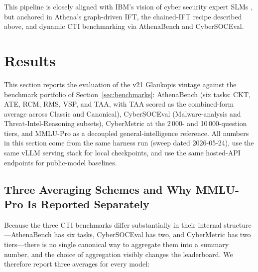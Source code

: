 \documentclass[webpdf,contemporary,large]{oup-authoring-template}
\theoremstyle{thmstyleone}
\theoremstyle{thmstyletwo}
\theoremstyle{thmstylethree}
\begin{document}
This pipeline is closely aligned with IBM's vision of cyber security expert SLMs \cite{levi2024cyberpal,levi2025toward}, but anchored in Athena's graph-driven IFT, the chained-IFT recipe described above, and dynamic CTI benchmarking via AthenaBench and CyberSOCEval.


\section{Results}
\label{sec:results}

This section reports the evaluation of the v21 Glaukopis vintage against the benchmark portfolio of Section~\ref{sec:benchmarks}: AthenaBench (six tasks: CKT, ATE, RCM, RMS, VSP, and TAA, with TAA scored as the combined-form average across Classic and Canonical), CyberSOCEval (Malware-analysis and Threat-Intel-Reasoning subsets), CyberMetric at the 2\,000- and 10\,000-question tiers, and MMLU-Pro as a decoupled general-intelligence reference. All numbers in this section come from the same harness run (sweep dated 2026-05-24), use the same vLLM serving stack for local checkpoints, and use the same hosted-API endpoints for public-model baselines.

\subsection{Three Averaging Schemes and Why MMLU-Pro Is Reported Separately}
\label{sec:results-averaging}

Because the three CTI benchmarks differ substantially in their internal structure---AthenaBench has six tasks, CyberSOCEval has two, and CyberMetric has two tiers---there is no single canonical way to aggregate them into a summary number, and the choice of aggregation visibly changes the leaderboard. We therefore report three averages for every model:
\end{document}
